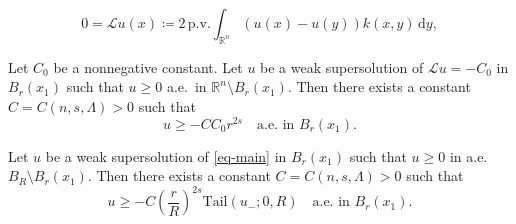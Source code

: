 \documentclass[10pt,a4paper]{amsart}
\begin{document}
\begin{equation}\label{eq-main}
        0=\mathcal{L}u(x)\coloneqq 2\,\mathrm{p.v.}\int_{\mathbb{R}^n} (u(x)-u(y))k(x, y)\,\mathrm{d}y,
\end{equation}

\begin{lemma}\label{lem-MP-nonhom}
Let $C_0$ be a nonnegative constant. Let $u$ be a weak supersolution of $\mathcal{L}u = -C_0$ in $B_{r}(x_1)$ such that $u \geq 0$ a.e.\ in $\mathbb{R}^n \setminus B_r(x_1)$. Then there exists a constant $C=C(n, s, \Lambda)>0$ such that
\begin{equation*}
    u \geq -CC_0r^{2s} \quad \text{a.e.\ in $B_r(x_1)$}.
\end{equation*}
\end{lemma}

\begin{lemma}\label{thm-loc-max-Om}
Let $u$ be a weak supersolution of \eqref{eq-main} in $B_r(x_1)$ such that $u \geq 0$ in a.e.\ $B_{R} \setminus B_{r}(x_1)$. Then there exists a constant $C=C(n,s, \Lambda)>0$ such that 
\begin{equation*}
u \geq -C\left(\frac{r}{R}\right)^{2s}\mathrm{Tail}(u_-; 0, R) \quad \text{a.e.\ in $B_r(x_1)$}.
\end{equation*}
\end{lemma}
\end{document}
